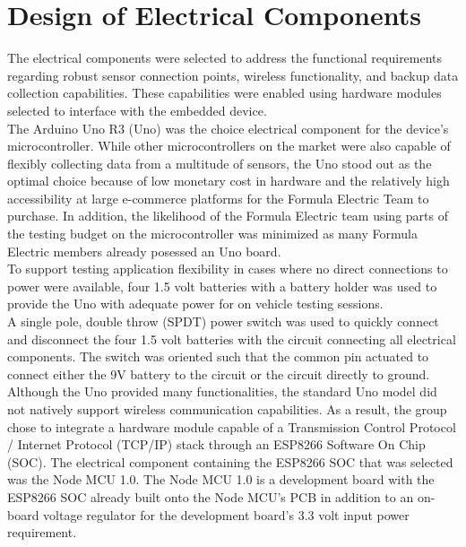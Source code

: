 \documentclass[12pt, titlepage]{article}
\begin{document}

\newpage
\section{Design of Electrical Components}


The electrical components were selected to address the functional requirements regarding robust sensor connection points, wireless functionality, and backup data collection capabilities. These capabilities were enabled using hardware modules selected to interface with the embedded device. \\

The Arduino Uno R3 (Uno) was the choice electrical component for the device's microcontroller. While other microcontrollers on the market were also capable of flexibly collecting data from a multitude of sensors, the Uno stood out as the optimal choice because of low monetary cost in hardware and the relatively high accessibility at large e-commerce platforms for the Formula Electric Team to purchase. In addition, the likelihood of the Formula Electric team using parts of the testing budget on the microcontroller was minimized as many Formula Electric members already posessed an Uno board. \\

To support testing application flexibility in cases where no direct connections to power were available, four 1.5 volt batteries with a battery holder was used to provide the Uno with adequate power for on vehicle testing sessions. \\

A single pole, double throw (SPDT) power switch was used to quickly connect and disconnect the four 1.5 volt batteries with the circuit connecting all electrical components. The switch was oriented such that the common pin actuated to connect either the 9V battery to the circuit or the circuit directly to ground. \\

Although the Uno provided many functionalities, the standard Uno model did not natively support wireless communication capabilities. As a result, the group chose to integrate a hardware module capable of a Transmission Control Protocol / Internet Protocol (TCP/IP) stack through an ESP8266 Software On Chip (SOC). The electrical component containing the ESP8266 SOC that was selected was the Node MCU 1.0. The Node MCU 1.0 is a development board with the ESP8266 SOC already built onto the Node MCU's PCB in addition to an on-board voltage regulator for the development board's 3.3 volt input power requirement. \\
\end{document}
